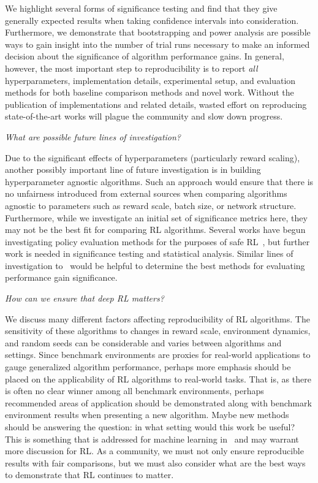 \documentclass[letterpaper]{article} %
\begin{document}
We highlight several forms of significance testing and find that they give generally expected results when taking confidence intervals into consideration. Furthermore, we demonstrate that bootstrapping and power analysis are possible ways to gain insight into the number of trial runs necessary to make an informed decision about the significance of algorithm performance gains. In general, however, the most important step to reproducibility is to report \textit{all} hyperparameters, implementation details, experimental setup, and evaluation methods for both baseline comparison methods and novel work. Without the publication of implementations and related details, wasted effort on reproducing state-of-the-art works will plague the community and slow down progress.
\medskip

\noindent \textit{What are possible future lines of investigation?}
\medskip

\noindent Due to the significant effects of hyperparameters (particularly reward scaling), another possibly important line of future investigation is in building hyperparameter agnostic algorithms. Such an approach would ensure that there is no unfairness introduced from external sources when comparing algorithms agnostic to parameters such as reward scale, batch size, or network structure. Furthermore, while we investigate an initial set of significance metrics here, they may not be the best fit for comparing RL algorithms. Several works have begun investigating policy evaluation methods for the purposes of safe RL~\cite{thomas2016data,thomas2015high}, but further work is needed in significance testing and statistical analysis. Similar lines of investigation to~\cite{nadeau2000inference,bouckaert2004evaluating} would be helpful to determine the best methods for evaluating performance gain significance.
\medskip

\noindent \textit{How can we ensure that deep RL matters?}
\medskip

\noindent We discuss many different factors affecting reproducibility of RL algorithms. The sensitivity of these algorithms to changes in reward scale, environment dynamics, and random seeds can be considerable and varies between algorithms and settings. Since benchmark environments are proxies for real-world applications to gauge generalized algorithm performance, perhaps more emphasis should be placed on the applicability of RL algorithms to real-world tasks. That is, as there is often no clear winner among all benchmark environments, perhaps recommended areas of application should be demonstrated along with benchmark environment results when presenting a new algorithm. Maybe new methods should be answering the question: in what setting would this work be useful? This is something that is addressed for machine learning in~\cite{wagstaff2012machine} and may warrant more discussion for RL. As a community, we must not only ensure reproducible results with fair comparisons, but we must also consider what are the best ways to demonstrate that RL continues to matter.
\end{document}
